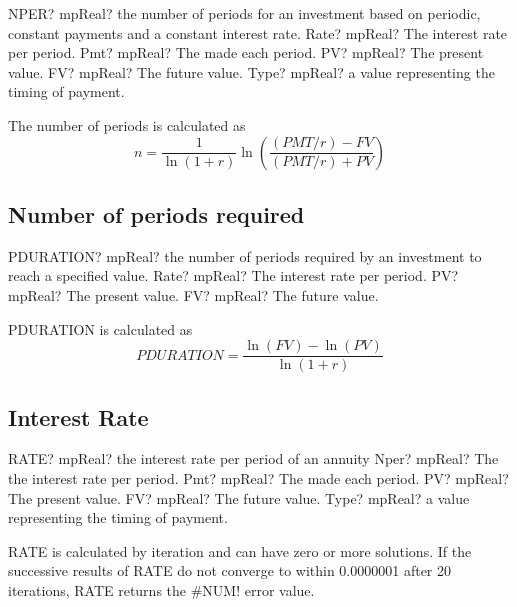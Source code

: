\begin{mpFunctionsExtract}
	\mpWorksheetFunctionFiveNotImplemented
	{NPER? mpReal? the number of periods for an investment based on periodic, constant payments and a constant interest rate.}
	{Rate? mpReal? The interest rate per period.}
	{Pmt? mpReal? The made each period.}
	{PV? mpReal? The present value.}
	{FV? mpReal? The future value.}
	{Type? mpReal? a value representing the timing of payment.}
\end{mpFunctionsExtract}

\vspace{0.3cm}
The number of periods is calculated as
\begin{equation}
n = \frac{1}{\ln(1+r)} \ln \left( \frac{(PMT/r)-FV}{(PMT/r)+PV} \right)
\end{equation}




\subsection{Number of periods required}

\begin{mpFunctionsExtract}
	\mpWorksheetFunctionThreeNotImplemented
	{PDURATION? mpReal?  the number of periods required by an investment to reach a specified value.}
	{Rate? mpReal? The interest rate per period.}
	{PV? mpReal? The present value.}
	{FV? mpReal? The future value.}
\end{mpFunctionsExtract}

PDURATION is calculated as
\begin{equation}
PDURATION = \frac{\ln(FV) - \ln(PV)}{\ln(1+r)} 
\end{equation}



\subsection{Interest Rate}


\begin{mpFunctionsExtract}
	\mpWorksheetFunctionFiveNotImplemented
	{RATE? mpReal? the interest rate per period of an annuity}
	{Nper? mpReal? The the interest rate per period.}
	{Pmt? mpReal? The made each period.}
	{PV? mpReal? The present value.}
	{FV? mpReal? The future value.}
	{Type? mpReal? a value representing the timing of payment.}
\end{mpFunctionsExtract}


\vspace{0.3cm}
RATE is calculated by iteration and can have zero or more solutions. If the successive results of RATE do not converge to within 0.0000001 after 20 iterations, RATE returns the \#NUM! error value.

